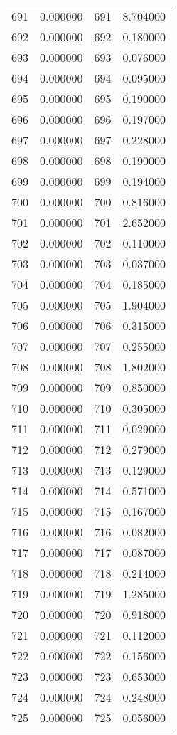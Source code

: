 \documentclass[12pt]{article}
\begin{document}
\begin{longtable}{@{}cccc@{}}
691 & 0.000000 & 691 & 8.704000 \\
692 & 0.000000 & 692 & 0.180000 \\
693 & 0.000000 & 693 & 0.076000 \\
694 & 0.000000 & 694 & 0.095000 \\
695 & 0.000000 & 695 & 0.190000 \\
696 & 0.000000 & 696 & 0.197000 \\
697 & 0.000000 & 697 & 0.228000 \\
698 & 0.000000 & 698 & 0.190000 \\
699 & 0.000000 & 699 & 0.194000 \\
700 & 0.000000 & 700 & 0.816000 \\
701 & 0.000000 & 701 & 2.652000 \\
702 & 0.000000 & 702 & 0.110000 \\
703 & 0.000000 & 703 & 0.037000 \\
704 & 0.000000 & 704 & 0.185000 \\
705 & 0.000000 & 705 & 1.904000 \\
706 & 0.000000 & 706 & 0.315000 \\
707 & 0.000000 & 707 & 0.255000 \\
708 & 0.000000 & 708 & 1.802000 \\
709 & 0.000000 & 709 & 0.850000 \\
710 & 0.000000 & 710 & 0.305000 \\
711 & 0.000000 & 711 & 0.029000 \\
712 & 0.000000 & 712 & 0.279000 \\
713 & 0.000000 & 713 & 0.129000 \\
714 & 0.000000 & 714 & 0.571000 \\
715 & 0.000000 & 715 & 0.167000 \\
716 & 0.000000 & 716 & 0.082000 \\
717 & 0.000000 & 717 & 0.087000 \\
718 & 0.000000 & 718 & 0.214000 \\
719 & 0.000000 & 719 & 1.285000 \\
720 & 0.000000 & 720 & 0.918000 \\
721 & 0.000000 & 721 & 0.112000 \\
722 & 0.000000 & 722 & 0.156000 \\
723 & 0.000000 & 723 & 0.653000 \\
724 & 0.000000 & 724 & 0.248000 \\
725 & 0.000000 & 725 & 0.056000 \\

\end{longtable}
\end{document}
